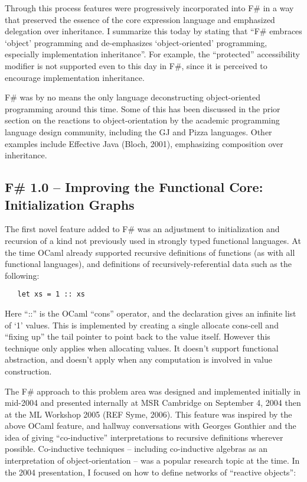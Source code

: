 \documentclass[acmsmall,review]{acmart}\settopmatter{printfolios=true,printccs=false,printacmref=false}
\begin{document}
Through this process features were progressively incorporated into F\# in a way that preserved the essence of the core expression language and emphasized delegation over inheritance.  I summarize this today by stating that “F\# embraces ‘object’ programming and de-emphasizes ‘object-oriented’ programming, especially implementation inheritance”.  For example, the “protected” accessibility modifier is not supported even to this day in F\#, since it is perceived to encourage implementation inheritance.

F\# was by no means the only language deconstructing object-oriented programming around this time. Some of this has been discussed in the prior section on the reactions to object-orientation by the academic programming language design community, including the GJ and Pizza languages. Other examples include Effective Java (Bloch, 2001), emphasizing composition over inheritance.


\subsection*{F\# 1.0 – Improving the Functional Core: Initialization Graphs}

The first novel feature added to F\# was an adjustment to initialization and recursion of a kind not previously used in strongly typed functional languages. At the time OCaml already supported recursive definitions of functions (as with all functional languages), and definitions of recursively-referential data such as the following:
\begin{verbatim}
   let xs = 1 :: xs
\end{verbatim}

Here “::” is the OCaml “cons” operator, and the declaration gives an infinite list of ‘1’ values. This is implemented by creating a single allocate cons-cell and “fixing up” the tail pointer to point back to the value itself.  However this technique only applies when allocating values.  It doesn’t support functional abstraction, and doesn’t apply when any computation is involved in value construction.

The F\# approach to this problem area was designed and implemented initially in mid-2004 and presented internally at MSR Cambridge on September 4, 2004 then at the ML Workshop 2005 (REF Syme, 2006). This feature was inspired by the above OCaml feature, and hallway conversations with Georges Gonthier and the idea of giving “co-inductive” interpretations to recursive definitions wherever possible.  Co-inductive techniques – including co-inductive algebras as an interpretation of object-orientation – was a popular research topic at the time. In the 2004 presentation, I focused on how to define networks of “reactive objects”: 
\end{document}
